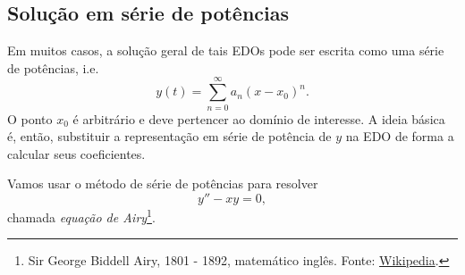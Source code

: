\subsection{Solução em série de potências}

Em muitos casos, a solução geral de tais EDOs pode ser escrita como uma série de potências, i.e.
\begin{equation}
  y(t) = \sum_{n=0}^{\infty} a_n(x-x_0)^n.
\end{equation}
O ponto $x_0$ é arbitrário e deve pertencer ao domínio de interesse. A ideia básica é, então, substituir a representação em série de potência de $y$ na EDO de forma a calcular seus coeficientes.

\begin{ex}
  Vamos usar o método de série de potências para resolver
  \begin{equation}
    y'' - xy = 0,
  \end{equation}
  chamada \emph{equação de Airy}\footnote{Sir George Biddell Airy, 1801 - 1892, matemático inglês. Fonte: \href{https://en.wikipedia.org/wiki/George_Biddell_Airy}{Wikipedia}.}.


\end{ex}
